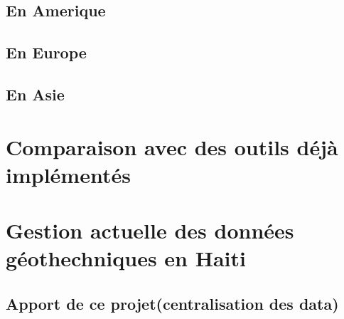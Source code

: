         \subsection{En Amerique}
        \lipsum[1]
        \subsection{En Europe}
        \lipsum[1]
        \subsection{En Asie}
        \lipsum[1]
    \section{Comparaison avec des outils déjà implémentés}
    \lipsum[1]
    \section{Gestion actuelle des données géothechniques en Haiti}
    \lipsum[1]
    \subsection{Apport de ce projet(centralisation des data)}
        \lipsum[1]